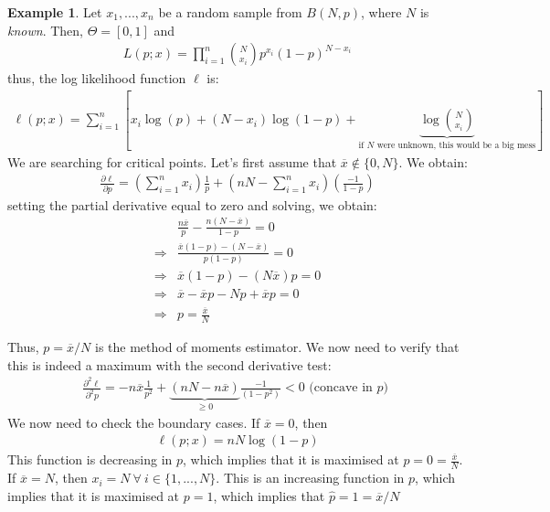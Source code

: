 \documentclass[11pt]{scrartcl}
\theoremstyle{definition}
\newtheorem{ex}{Example}
\theoremstyle{remark}
\begin{document}
{\begin{ex}
	Let $x_1, ..., x_n$ be a random sample from $B(N, p)$, where $N$ is \emph{known}. Then, $\Theta = [0,1]$ and 
	\begin{align*}
		L(p; x) = \prod_{i=1}^n \binom{N}{x_i} p^{x_i} (1-p)^{N-x_i} 	
	\end{align*}
	thus, the log likelihood function $\ell$ is: 
	\begin{align*}
		\ell(p;x)  = \sum_{i=1}^n \left[ x_i \log(p) + (N-x_i) \log(1-p) + \underbrace{\log \binom{N}{x_i}	}_{\text{if $N$ were unknown, this would be a big mess}}		\right] 
	\end{align*}
	We are searching for critical points. Let's first assume that $\overline{x} \notin \{0, N \}$. We obtain: 
	\begin{align*}
		\frac{\partial \ell}{\partial p}	 = \left( \sum_{i=1}^n x_i \right) \frac{1}{p} + \left( nN - \sum_{i=1}^n x_i \right) \left( \frac{-1}{1-p} \right) 
	\end{align*}
	setting the partial derivative equal to zero and solving, we obtain: 
	\begin{align*}
		& \frac{n\overline{x}}{p} - \frac{n(N-\overline{x})}{1-p} = 0 \\
		\Rightarrow & \frac{\overline{x}(1-p)-(N-\overline{x})}{p(1-p)} = 0 \\
		\Rightarrow & \overline{x}(1-p) - (N \overline{x})p = 0 \\
		\Rightarrow & \overline{x} - \overline{x} p - N p + \overline{x} p = 0 \\
		\Rightarrow & p  = \frac{\overline{x}}{N}	
	\end{align*}

\end{ex}
Thus, $p = \overline{x} / N$ is the method of moments estimator. We now need to verify that this is indeed a maximum with the second derivative test: 
\begin{align*}
	\frac{\partial^2 \ell}{\partial^2 p}	 = -n \overline{x} \frac{1}{p^2} + \underbrace{(nN - n \overline{x})}_{\geq 0 } \frac{-1}{(1-p^2)} < 0  \text{ (concave in $p$) } 
\end{align*}
We now need to check the boundary cases. If $\overline{x} = 0$, then 
\begin{align*}
	\ell(p; x) = nN \log (1-p) 	
\end{align*}
This function is decreasing in $p$, which implies that it is maximised at $p=0 = \frac{\overline{x}}{N}$. If $\overline{x} = N$, then $x_i = N\ \forall\ i \in \{ 1, ..., N \}$. This is an increasing function in $p$, which implies that it is maximised at $p=1$, which implies that $\hat{p} = 1 = \overline{x}/N$ 

}
\end{document}

